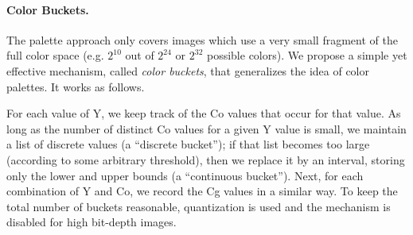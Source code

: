 \documentclass{article}
\begin{document}
\paragraph{Color Buckets.}
\label{sec:auto-indexing}
The palette approach only covers images which use a very small fragment of the full color space
(e.g. $2^{10}$ out of $2^{24}$ or $2^{32}$ possible colors).
We propose a simple yet effective mechanism, called {\it color buckets},
that generalizes the idea of color palettes. It works as follows.

For each value of Y, we keep track of the Co values that occur for that value. As long as the number of
distinct Co values for a given Y value is small, we maintain a list of discrete values (a ``discrete bucket'');
if that list becomes too large (according to some arbitrary threshold),
then we replace it by an interval, storing only the lower and upper bounds (a ``continuous bucket'').
Next, for each combination of Y and Co, we record the Cg values in a similar way.
To keep the total number of buckets reasonable, quantization is used and the mechanism is disabled
for high bit-depth images.




\end{document}
